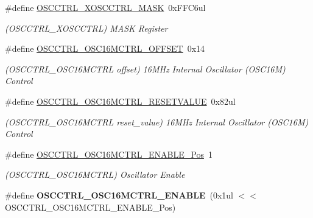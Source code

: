 \begin{DoxyCompactItemize}
\item 
\hypertarget{group___s_a_m_l21___o_s_c_c_t_r_l_ga3569b3c01688e4b0d67f24f451162353}{}\#define \hyperlink{group___s_a_m_l21___o_s_c_c_t_r_l_ga3569b3c01688e4b0d67f24f451162353}{O\+S\+C\+C\+T\+R\+L\+\_\+\+X\+O\+S\+C\+C\+T\+R\+L\+\_\+\+M\+A\+S\+K}~0x\+F\+F\+C6ul\label{group___s_a_m_l21___o_s_c_c_t_r_l_ga3569b3c01688e4b0d67f24f451162353}

\begin{DoxyCompactList}\small\item\em (O\+S\+C\+C\+T\+R\+L\+\_\+\+X\+O\+S\+C\+C\+T\+R\+L) M\+A\+S\+K Register \end{DoxyCompactList}\item 
\hypertarget{group___s_a_m_l21___o_s_c_c_t_r_l_ga3451af768403c9444c830fd69ef2a994}{}\#define \hyperlink{group___s_a_m_l21___o_s_c_c_t_r_l_ga3451af768403c9444c830fd69ef2a994}{O\+S\+C\+C\+T\+R\+L\+\_\+\+O\+S\+C16\+M\+C\+T\+R\+L\+\_\+\+O\+F\+F\+S\+E\+T}~0x14\label{group___s_a_m_l21___o_s_c_c_t_r_l_ga3451af768403c9444c830fd69ef2a994}

\begin{DoxyCompactList}\small\item\em (O\+S\+C\+C\+T\+R\+L\+\_\+\+O\+S\+C16\+M\+C\+T\+R\+L offset) 16\+M\+Hz Internal Oscillator (O\+S\+C16\+M) Control \end{DoxyCompactList}\item 
\hypertarget{group___s_a_m_l21___o_s_c_c_t_r_l_gaf23818b455b2bdf38735bff9d1aca4ec}{}\#define \hyperlink{group___s_a_m_l21___o_s_c_c_t_r_l_gaf23818b455b2bdf38735bff9d1aca4ec}{O\+S\+C\+C\+T\+R\+L\+\_\+\+O\+S\+C16\+M\+C\+T\+R\+L\+\_\+\+R\+E\+S\+E\+T\+V\+A\+L\+U\+E}~0x82ul\label{group___s_a_m_l21___o_s_c_c_t_r_l_gaf23818b455b2bdf38735bff9d1aca4ec}

\begin{DoxyCompactList}\small\item\em (O\+S\+C\+C\+T\+R\+L\+\_\+\+O\+S\+C16\+M\+C\+T\+R\+L reset\+\_\+value) 16\+M\+Hz Internal Oscillator (O\+S\+C16\+M) Control \end{DoxyCompactList}\item 
\hypertarget{group___s_a_m_l21___o_s_c_c_t_r_l_ga49b58dcdbb06772d3d378bd4e0f9f7a6}{}\#define \hyperlink{group___s_a_m_l21___o_s_c_c_t_r_l_ga49b58dcdbb06772d3d378bd4e0f9f7a6}{O\+S\+C\+C\+T\+R\+L\+\_\+\+O\+S\+C16\+M\+C\+T\+R\+L\+\_\+\+E\+N\+A\+B\+L\+E\+\_\+\+Pos}~1\label{group___s_a_m_l21___o_s_c_c_t_r_l_ga49b58dcdbb06772d3d378bd4e0f9f7a6}

\begin{DoxyCompactList}\small\item\em (O\+S\+C\+C\+T\+R\+L\+\_\+\+O\+S\+C16\+M\+C\+T\+R\+L) Oscillator Enable \end{DoxyCompactList}\item 
\hypertarget{group___s_a_m_l21___o_s_c_c_t_r_l_gaf7422dc1e32992f76884cbf5a4d36b6c}{}\#define {\bfseries O\+S\+C\+C\+T\+R\+L\+\_\+\+O\+S\+C16\+M\+C\+T\+R\+L\+\_\+\+E\+N\+A\+B\+L\+E}~(0x1ul $<$$<$ O\+S\+C\+C\+T\+R\+L\+\_\+\+O\+S\+C16\+M\+C\+T\+R\+L\+\_\+\+E\+N\+A\+B\+L\+E\+\_\+\+Pos)\label{group___s_a_m_l21___o_s_c_c_t_r_l_gaf7422dc1e32992f76884cbf5a4d36b6c}


\end{DoxyCompactItemize}
